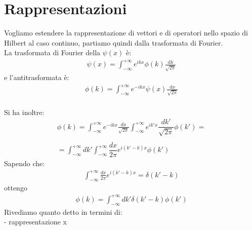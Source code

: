 \section{Rappresentazioni} %
\begin{flushleft}
Vogliamo estendere la rappresentazione di vettori e di operatori nello spazio di Hilbert al caso continuo, partiamo quindi dalla trasformata di Fourier.\\
La trasformata di Fourier della $\psi \left(x\right)$ è:
\begin{equation}\begin{split}
\psi \left(x\right)=\int_{-\infty }^{+\infty }{e^{ikx}\phi\left(k\right) \frac{\textrm{d}k}{\sqrt{2\pi}}}
\end{split}\end{equation}
e l'antitrasformata è:
\begin{equation}\begin{split}
\phi \left(k\right)=\int^{+\infty }_{-\infty }{e^{-ikx}\psi \left(x\right) \frac{\textrm{d}x}{\sqrt{2\pi}}}
\end{split}\end{equation}\\
Si ha inoltre:\\
\begin{equation}\begin{split}
\phi \left(k\right)
=\int^{+\infty }_{-\infty } {e^{-ikx}\frac{dx}{\sqrt{2\pi}}}
\int^{+\infty }_{-\infty }{e^{ik'x}\dfrac{dk'}{\sqrt{2\pi}}} \phi \left(k'\right)=\\
\\
=\int^{+\infty }_{-\infty }{dk'}\int^{+\infty }_{-\infty } \dfrac{dx}{2\pi}{e^{i\left(k'-k\right)x}}\phi\left(k'\right)
\end{split}\end{equation}
Sapendo che: 
\begin{equation}\begin{split}
\int^{+\infty }_{-\infty }\frac{dx}{2\pi}{e^{i\left(k'-k\right)x}}=
\delta\left(k'-k\right)
\end{split}\end{equation}
ottengo
\begin{equation}\begin{split}
\phi \left(k\right)= \int^{+\infty }_{-\infty }{dk'} \delta\left(k'-k\right)\phi \left(k'\right)
\end{split}\end{equation} 
Rivediamo quanto detto in termini di:\\
- rappresentazione x\\

\end{flushleft}
